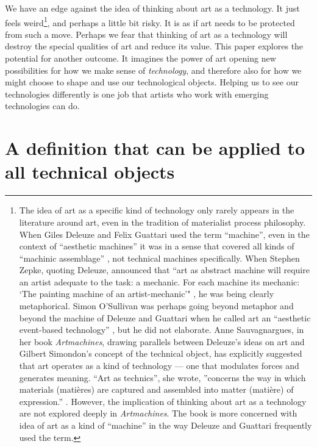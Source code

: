 \documentclass[letterpaper]{article}
\begin{document}
    We have an edge against the idea of thinking about art as a technology. It just feels weird\footnote{
        The idea of art as a specific kind of technology only rarely appears in the literature around art, even in the tradition of materialist process philosophy. When Giles Deleuze and Felix Guattari used the term “machine”, even in the context of “aesthetic machines” \citep[p.42]{GuattariChsmss1995} it was in a sense that covered all kinds of “machinic assemblage” \citep[p.41]{GuattariChsmss1995}, not technical machines specifically. When Stephen Zepke, quoting Deleuze, announced that “art as abstract machine will require an artist adequate to the task: a mechanic. For each machine its mechanic: ‘The painting machine of an artist-mechanic’" \citep[p.1]{ZepkeArtAsAbstrctMchn2005}, he was being clearly metaphorical. Simon O'Sullivan was perhaps going beyond metaphor and beyond the machine of Deleuze and Guattari when he called art an “aesthetic event-based technology” \citep[p.202]{ZepkeOSullivanDlzCntmprryArt2010}, but he did not elaborate. Anne Sauvagnargues, in her book \emph{Artmachines}, drawing parallels between Deleuze’s ideas on art and Gilbert Simondon’s concept of the technical object, has explicitly suggested that art operates as a kind of technology — one that modulates forces and generates meaning. “Art as technics”, she wrote, ”concerns the way in which materials (matières) are captured and assembled into matter (matière) of expression.” \citep[pp.74-75]{SauvagnarguesArtmchns2016}. However, the implication of thinking about art as a technology are not explored deeply in \emph{Artmachines}. The book is more concerned with idea of art as a kind of “machine” in the way Deleuze and Guattari frequently used the term.
    }, and perhaps a little bit risky. It is as if art needs to be protected from such a move. Perhaps we fear that thinking of art as a technology will destroy the special qualities of art and reduce its value. This paper explores the potential for another outcome. It imagines the power of art opening new possibilities for how we make sense of \emph{technology}, and therefore also for how we might choose to shape and use our technological objects. Helping us to see our technologies differently is one job that artists who work with emerging technologies can do.

\section{A definition that can be applied to all technical objects} 
\end{document}
